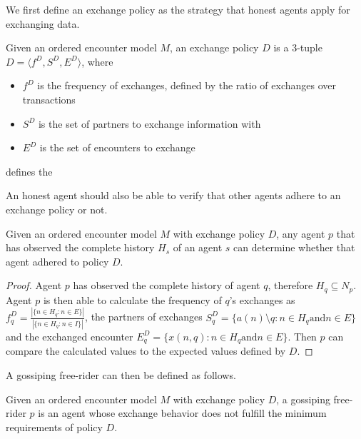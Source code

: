 We first define an exchange policy as the strategy that honest agents apply for exchanging data.

\begin{defn}
    Given an ordered encounter model $M$, an exchange policy $D$ is a 3-tuple $D = \langle f^D, S^D, E^D\rangle$,
    where
    
    \begin{itemize}
        \item $f^D$ is the frequency of exchanges, defined by the ratio of exchanges over transactions
        \item $S^D$ is the set of partners to exchange information with
        \item $E^D$ is the set of encounters to exchange
    \end{itemize}defines the
\end{defn}

An honest agent should also be able to verify that other agents adhere to an exchange policy or not.

\begin{lem}
    \label{lem:policy_adherence}
    Given an ordered encounter model $M$ with exchange policy $D$, any agent $p$ that has observed 
    the complete history $H_s$ of an agent $s$ can determine whether that agent adhered to policy 
    $D$.
\end{lem}
\begin{proof}
    Agent $p$ has observed the complete history of agent $q$, therefore $H_q \subseteq N_p$. Agent 
    $p$ is then able to calculate the frequency of $q$'s exchanges as $f^D_q = \frac{|\{ n \in H_q : n \in E \}|}{|\{ n \in H_q : n \in I \}|}$,
    the partners of exchanges $S^D_q = \{ a(n) \setminus q : n \in H_q \text{and} n \in E \}$ and the 
    exchanged encounter $E^D_q = \{ x(n,q) : n \in H_q \text{and} n \in E \}$. Then $p$ can compare
    the calculated values to the expected values defined by $D$. 
\end{proof}

A gossiping free-rider can then be defined as follows.

\begin{defn}
    \label{def:gos_free-rider}
    Given an ordered encounter model $M$ with exchange policy $D$, a gossiping free-rider $p$ is an 
    agent whose exchange behavior does not fulfill the minimum requirements of policy $D$. 
\end{defn}

